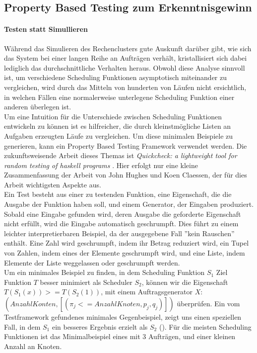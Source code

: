 \FloatBarrier
\subsection{Property Based Testing zum Erkenntnisgewinn}
\label{proptest}
\paragraph{Testen statt Simullieren}
Während das Simulieren des Rechenclusters gute Auskunft darüber gibt, wie sich das System bei einer langen Reihe an Aufträgen verhält, kristallisiert sich dabei lediglich das durchschnittliche Verhalten heraus. Obwohl diese Analyse sinnvoll ist, um verschiedene Scheduling Funktionen asymptotisch miteinander zu vergleichen, wird durch das Mitteln von hunderten von Läufen nicht ersichtlich, in welchen Fällen eine normalerweise unterlegene Scheduling Funktion einer anderen überlegen ist.\\
Um eine Intuition für die Unterschiede zwischen Scheduling Funktionen entwickeln zu können ist es hilfreicher, die durch kleinstmögliche Listen an Aufgaben erzeugten Läufe zu vergleichen. Um diese minimalen Beispiele zu generieren, kann ein Property Based Testing Framework verwendet werden. Die zukunftsweisende Arbeit dieses Themas ist \emph{Quickcheck: a lightweight tool for random testing of haskell programs} \cite{hughes2000quickcheck}. Hier erfolgt nur eine kleine Zusammenfassung der Arbeit von John Hughes und Koen Claessen, der für dies Arbeit wichtigsten Aspekte aus. \\
Ein Test besteht aus einer zu testenden Funktion, eine Eigenschaft, die die Ausgabe der Funktion haben soll, und einem Generator, der Eingaben produziert. Sobald eine Eingabe gefunden wird, deren Ausgabe die geforderte Eigenschaft nicht erfüllt, wird die Eingabe automatisch geschrumpft. Dies führt zu einem leichter interpretierbaren Beispiel, da der ausgegebene Fall ''kein Rauschen'' enthält.
Eine Zahl wird geschrumpft, indem ihr Betrag reduziert wird, ein Tupel von Zahlen, indem eines der Elemente geschrumpft wird, und eine Liste, indem Elemente der Liste weggelassen oder geschrumpft werden.\\

Um ein minimales Beispiel zu finden, in dem Scheduling Funktion $S_1$ Ziel Funktion $T$ besser minimiert als Scheduler $S_2$, können wir die Eigenschaft $T(S_1(x)) >= T (S_2(1))$, mit einem Auftragsgenerator $X$: $(Anzahl Konten,[(\pi_j <= Anzahl Knoten,p_j,q_j)])$ überprüfen.
Ein vom Testframework gefundenes minimales Gegenbeispiel, zeigt uns einen speziellen Fall, in dem $S_1$ ein besseres Ergebnis erzielt als $S_2$ (\cite{TestOpt}).
Für die meisten Scheduling Funktionen ist das Minimalbeispiel eines mit 3 Aufträgen, und einer kleinen Anzahl an Knoten.

